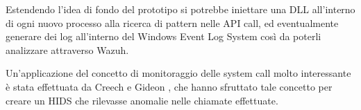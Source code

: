Estendendo l'idea di fondo del prototipo si potrebbe iniettare una DLL all'interno di ogni nuovo processo alla ricerca di pattern nelle API call, ed eventualmente generare dei log all'interno del Windows Event Log System  così da poterli analizzare attraverso Wazuh.

\medskip
Un'applicazione del concetto di monitoraggio delle system call molto interessante è stata effettuata da Creech e Gideon \cite{creech2014developing}, che hanno sfruttato tale concetto per creare un HIDS che rilevasse anomalie nelle chiamate effettuate.